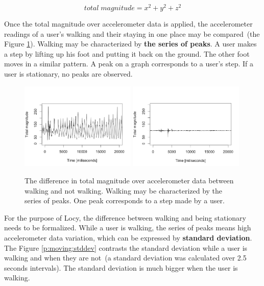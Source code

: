 \begin{equation}\label{e:total_magnitude}
total\;magnitude = x^2 + y^2 + z^2
\end{equation}

Once the total magnitude over accelerometer data is applied, the accelerometer readings of a user's walking and their staying in one place may be compared\ (the Figure \ref{p:moving:magnitude}). Walking may be characterized by \textbf{the series of peaks}. A user makes a step by lifting up his foot and putting it back on the ground. The other foot moves in a similar pattern. A peak on a graph corresponds to a user's step. If a user is stationary, no peaks are observed. 

\begin{figure}[H]
\centering
\includegraphics[width=0.49\textwidth, scale=0.6]{plots/walking}
\includegraphics[width=0.49\textwidth, scale=0.6]{plots/no_walking}
\caption{\label{p:moving:magnitude} The difference in total magnitude over accelerometer data between walking and not walking. Walking may be characterized by the series of peaks. One peak corresponds to  a step made by a user.}
\end{figure}

For the purpose of Locy, the difference between walking and being stationary needs to be formalized. While a user is walking, the series of peaks means high accelerometer data variation, which can be expressed by \textbf{standard deviation}. The Figure \ref{p:moving:stddev} contrasts the standard deviation while a user is walking and when they are not\ (a standard deviation was calculated over 2.5 seconds intervals). The standard deviation is much bigger when the user is walking.


